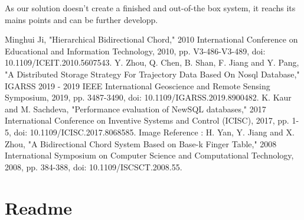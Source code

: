 \documentclass{article}
\begin{document}
As our solution doesn't create a finished and out-of-the box system, it reachs its mains points and can be further developp.


\pagebreak

\begin{thebibliography}{9}
Minghui Ji, "Hierarchical Bidirectional Chord," 2010 International Conference on Educational and Information Technology, 2010, pp. V3-486-V3-489, doi: 10.1109/ICEIT.2010.5607543.
Y. Zhou, Q. Chen, B. Shan, F. Jiang and Y. Pang, "A Distributed Storage Strategy For Trajectory Data Based On Nosql Database," IGARSS 2019 - 2019 IEEE International Geoscience and Remote Sensing Symposium, 2019, pp. 3487-3490, doi: 10.1109/IGARSS.2019.8900482.
K. Kaur and M. Sachdeva, "Performance evaluation of NewSQL databases," 2017 International Conference on Inventive Systems and Control (ICISC), 2017, pp. 1-5, doi: 10.1109/ICISC.2017.8068585.
Image Reference : H. Yan, Y. Jiang and X. Zhou, "A Bidirectional Chord System Based on Base-k Finger Table," 2008 International Symposium on Computer Science and Computational Technology, 2008, pp. 384-388, doi: 10.1109/ISCSCT.2008.55.
\end{thebibliography}

\pagebreak

\appendix

\section{Readme}


\end{document}
